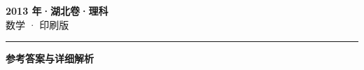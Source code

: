 \documentclass[zihao=5, a4paper]{ctexart}
\begin{document}
\begin{center}
  {\Large\bfseries 2013 年·湖北卷·理科}\\[4pt]
  {\large 数学 · 印刷版}
\end{center}
\medskip
{}

\par\bigskip\hrule\bigskip
{}
\Needspace{0.55\textheight}
\begin{center}{\large\bfseries 参考答案与详细解析}\end{center}
\smallskip

\end{document}
